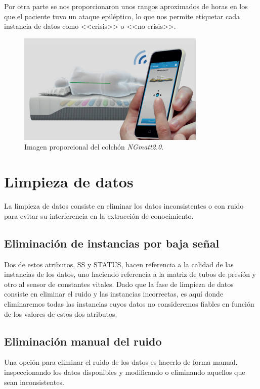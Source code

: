 Por otra parte se nos proporcionaron unos rangos aproximados de horas en los que el paciente tuvo un ataque epiléptico, lo que nos permite etiquetar cada instancia de datos como <<crisis>> o <<no crisis>>.  

\begin{figure}[H]
	\centering
	\includegraphics[width=0.8\textwidth]{../img/ngmatt.png}
	\caption{Imagen proporcional del colchón \textit{NGmatt2.0}.}
	\label{fig:ngmatt}
\end{figure}

\section{Limpieza de datos}

La limpieza de datos consiste en eliminar los datos inconsistentes o con ruido para evitar su interferencia en la extracción de conocimiento. 

\subsection{Eliminación de instancias por baja señal}

Dos de estos atributos, SS y STATUS, hacen referencia a la calidad de las instancias de los datos, uno haciendo referencia a la matriz de tubos de presión y otro al sensor de constantes vitales. Dado que la fase de limpieza de datos consiste en eliminar el ruido y las instancias incorrectas, es aquí donde eliminaremos todas las instancias cuyos datos no consideremos fiables en función de los valores de estos dos atributos. 

\subsection{Eliminación manual del ruido}

Una opción para eliminar el ruido de los datos es hacerlo de forma manual, inspeccionando los datos disponibles y modificando o eliminando aquellos que sean inconsistentes.  

